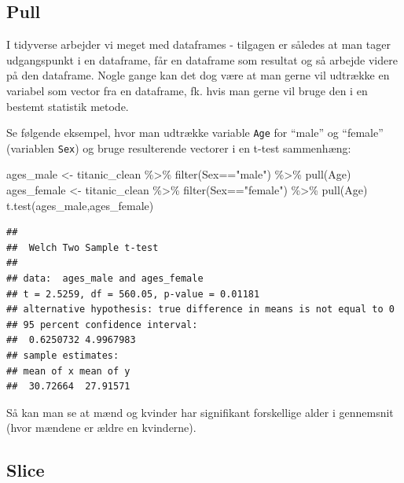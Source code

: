 \documentclass[
]{book}
\newenvironment{Shaded}{\begin{snugshade}}{\end{snugshade}}
\newcommand{\FunctionTok}[1]{\textcolor[rgb]{0.00,0.00,0.00}{#1}}
\newcommand{\NormalTok}[1]{#1}
\newcommand{\OtherTok}[1]{\textcolor[rgb]{0.56,0.35,0.01}{#1}}
\newcommand{\SpecialCharTok}[1]{\textcolor[rgb]{0.00,0.00,0.00}{#1}}
\newcommand{\StringTok}[1]{\textcolor[rgb]{0.31,0.60,0.02}{#1}}
\begin{document}
\hypertarget{pull}{%
\subsection{Pull}\label{pull}}

I tidyverse arbejder vi meget med dataframes - tilgagen er således at man tager udgangspunkt i en dataframe, får en dataframe som resultat og så arbejde videre på den dataframe. Nogle gange kan det dog være at man gerne vil udtrække en variabel som vector fra en dataframe, fk. hvis man gerne vil bruge den i en bestemt statistik metode.

Se følgende eksempel, hvor man udtrække variable \texttt{Age} for ``male'' og ``female'' (variablen \texttt{Sex}) og bruge resulterende vectorer i en t-test sammenhæng:

\begin{Shaded}
\begin{Highlighting}[]
\NormalTok{ages\_male }\OtherTok{\textless{}{-}}\NormalTok{ titanic\_clean }\SpecialCharTok{\%\textgreater{}\%} \FunctionTok{filter}\NormalTok{(Sex}\SpecialCharTok{==}\StringTok{"male"}\NormalTok{) }\SpecialCharTok{\%\textgreater{}\%} \FunctionTok{pull}\NormalTok{(Age)}
\NormalTok{ages\_female }\OtherTok{\textless{}{-}}\NormalTok{ titanic\_clean }\SpecialCharTok{\%\textgreater{}\%} \FunctionTok{filter}\NormalTok{(Sex}\SpecialCharTok{==}\StringTok{"female"}\NormalTok{) }\SpecialCharTok{\%\textgreater{}\%} \FunctionTok{pull}\NormalTok{(Age)}
\FunctionTok{t.test}\NormalTok{(ages\_male,ages\_female)}
\end{Highlighting}
\end{Shaded}

\begin{verbatim}
## 
##  Welch Two Sample t-test
## 
## data:  ages_male and ages_female
## t = 2.5259, df = 560.05, p-value = 0.01181
## alternative hypothesis: true difference in means is not equal to 0
## 95 percent confidence interval:
##  0.6250732 4.9967983
## sample estimates:
## mean of x mean of y 
##  30.72664  27.91571
\end{verbatim}

Så kan man se at mænd og kvinder har signifikant forskellige alder i gennemsnit (hvor mændene er ældre en kvinderne).

\hypertarget{slice}{%
\subsection{Slice}\label{slice}}
\end{document}

